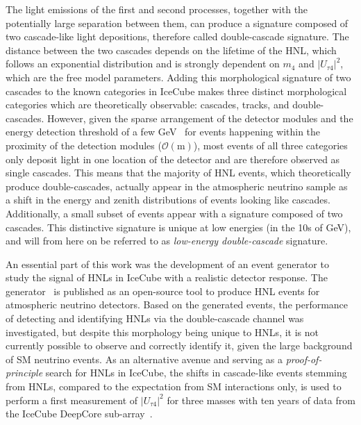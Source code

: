 \documentclass[
    aps,
    prd,
    reprint,
    amsmath,
    amssymb,
    nofootinbib,
    superscriptaddress,
    floatfix
]{revtex4-2}
\newcommand{\gev}{\giga\electronvolt}
\def\ut4{$|U_{\tau4}|^2$}
\begin{document}
The light emissions of the first and second processes, together with the potentially large separation between them, can produce a signature composed of two cascade-like light depositions, therefore called double-cascade signature.
The distance between the two cascades depends on the lifetime of the HNL, which follows an exponential distribution and is strongly dependent on $m_4$ and \ut4, which are the free model parameters.
Adding this morphological signature of two cascades to the known categories in IceCube makes three distinct morphological categories which are theoretically observable: cascades, tracks, and double-cascades.
However, given the sparse arrangement of the detector modules and the energy detection threshold of a few \si{\gev}~\cite{IceCube:2022kff} for events happening within the proximity of the detection modules ($\mathcal{O}(\si{\meter})$), most events of all three categories only deposit light in one location of the detector and are therefore observed as single cascades.
This means that the majority of HNL events, which theoretically produce double-cascades, actually appear in the atmospheric neutrino sample as a shift in the energy and zenith distributions of events looking like cascades. Additionally, a small subset of events appear with a signature composed of two cascades. This distinctive signature is unique at low energies (in the 10s of GeV), and will from here on be referred to as \textit{low-energy double-cascade} signature.

An essential part of this work was the development of an event generator to study the signal of HNLs in IceCube with a realistic detector response.
The generator~\cite{LeptonInjector-HNL} is published as an open-source tool to produce HNL events for atmospheric neutrino detectors. 
Based on the generated events, the performance of detecting and identifying HNLs via the double-cascade channel was investigated, but despite this morphology being unique to HNLs, it is not currently possible to observe and correctly identify it, given the large background of SM neutrino events.
As an alternative avenue and serving as a \textit{proof-of-principle} search for HNLs in IceCube, the shifts in cascade-like events stemming from HNLs, compared to the expectation from SM interactions only, is used to perform a first measurement of \ut4 for three masses with ten years of data from the IceCube DeepCore sub-array~\cite{IceCube:2011ucd}.
\end{document}
